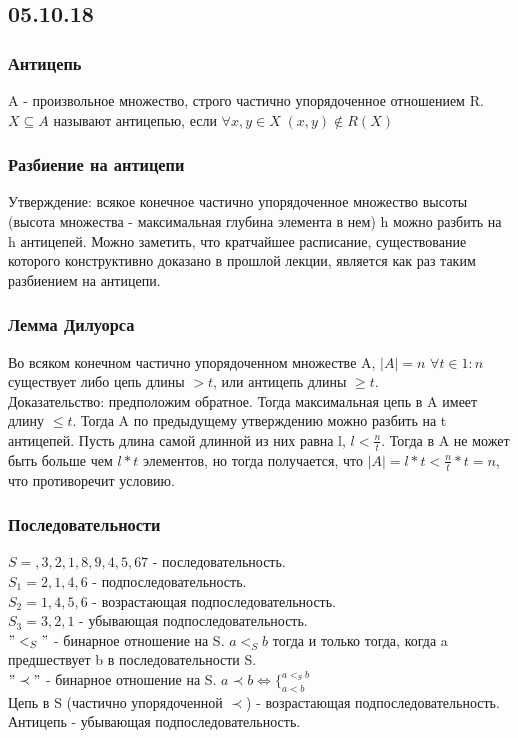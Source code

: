 \subsection{05.10.18}
\subsubsection{Антицепь}
A - произвольное множество, строго частично упорядоченное отношением R. $X \subseteq A$ называют антицепью, если $\forall x, y \in X \; (x, y) \not\in R(X)$
\subsubsection{Разбиение на антицепи}
Утверждение: всякое конечное частично упорядоченное множество высоты (высота множества - максимальная глубина элемента в нем) h можно разбить на h антицепей. Можно заметить, что кратчайшее расписание, существование которого конструктивно доказано в прошлой лекции, является как раз таким разбиением на антицепи.
\subsubsection{Лемма Дилуорса}
Во всяком конечном частично упорядоченном множестве A, $|A| = n$ $\forall t \in 1:n$ существует либо цепь длины $> t$, или антицепь длины $\geq t$. \\
Доказательство: предположим обратное. Тогда максимальная цепь в A имеет длину $\leq t$. Тогда A по предыдущему утверждению можно разбить на t антицепей. Пусть длина самой длинной из них равна l, $l < \frac{n}{t}$. Тогда в A не может быть больше чем $l * t$ элементов, но тогда получается, что $|A| = l * t < \frac{n}{t} * t = n$, что противоречит условию.
\subsubsection{Последовательности}
$S = , 3, 2, 1, 8, 9, 4, 5, 67$ - последовательность.\\
$S_1 = 2, 1, 4, 6$ - подпоследовательность.\\
$S_2 = 1, 4, 5, 6$ - возрастающая подпоследовательность.\\
$S_3 = 3, 2, 1$ - убывающая подпоследовательность.\\
$"<_S"$ - бинарное отношение на S. $a <_S b$ тогда и только тогда, когда a предшествует b в последовательности S.\\
$"\prec"$ - бинарное отношение на S. $a \prec b \Leftrightarrow \{_{a < b}^{a <_S b}$\\
Цепь в S (частично упорядоченной $\prec$) - возрастающая подпоследовательность. Антицепь - убывающая подпоследовательность.
